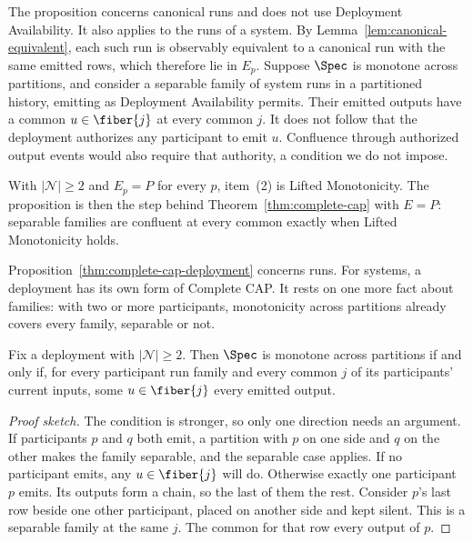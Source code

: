 The proposition concerns canonical runs and does not use Deployment
Availability.  It also applies to the runs of a system.  By
Lemma~\ref{lem:canonical-equivalent}, each such run is observably equivalent to
a canonical run with the same emitted rows, which therefore lie in $E_p$.
Suppose $\Spec$ is monotone across partitions, and consider a separable family
of system runs in a partitioned history, emitting as Deployment Availability
permits.  Their emitted outputs have a common \outnoun $u\in\fiber{j}$ at every
common \indesc $j$.  It does not follow that the deployment authorizes any
participant to emit $u$.  Confluence through authorized output events would
also require that authority, a condition we do not impose.

With $|\mathcal N|\ge2$ and $E_p=P$ for every $p$, item~(2) is Lifted
Monotonicity.  The proposition is then the step behind
Theorem~\ref{thm:complete-cap} with $E=P$: separable families are confluent at
every common \indesc exactly when Lifted Monotonicity holds.

Proposition~\ref{thm:complete-cap-deployment} concerns runs.  For systems, a
deployment has its own form of Complete CAP.  It rests on one more fact about
families: with two or more participants, monotonicity across partitions
already covers every family, separable or not.

\begin{lemma}
\label{lem:deployment-compatible}
Fix a deployment with $|\mathcal N|\ge2$.  Then $\Spec$ is monotone across
partitions if and only if, for every participant run family and every common
\indesc $j$ of its participants' current inputs, some $u\in\fiber{j}$
\outrel every emitted output.
\end{lemma}

\begin{proof}[Proof sketch]
The condition is stronger, so only one direction needs an argument.  If
participants $p$ and $q$ both emit, a partition with $p$ on one side and $q$ on
the other makes the family separable, and the separable case applies.  If no
participant emits, any $u\in\fiber{j}$ will do.  Otherwise exactly one
participant $p$ emits.  Its outputs form a chain, so the last of them \outrel
the rest.  Consider $p$'s last row beside one other participant, placed on
another side and kept silent.  This is a separable family at the same $j$.
The common \outnoun for that row \outrel every output of $p$.
\end{proof}

